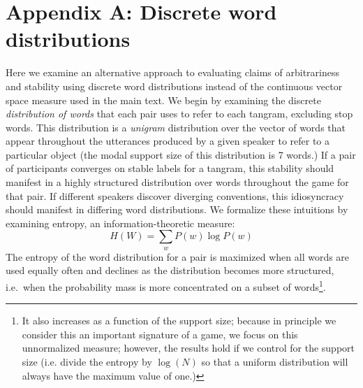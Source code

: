 \documentclass[alpha-refs]{wiley-article}
\begin{document}
\printendnotes



\section*{Appendix A: Discrete word distributions}

Here we examine an alternative approach to evaluating claims of arbitrariness 
 and stability using discrete word distributions instead of the continuous vector space measure used in the main text.
We begin by examining the discrete \emph{distribution of words} that each pair uses to refer to each tangram, excluding stop words.
This distribution is a \emph{unigram} distribution over the vector of words that appear throughout the utterances produced by a given speaker to refer to a particular object (the modal support size of this distribution is 7 words.)
If a pair of participants converges on stable labels for a tangram, this stability should manifest in a highly structured distribution over words throughout the game for that pair.
If different speakers discover diverging conventions, this idiosyncracy should manifest in differing word distributions.
We formalize these intuitions by examining entropy, an information-theoretic measure: $$H(W) = \sum_w P(w) \log P(w)$$
The entropy of the word distribution for a pair is maximized when all words are used equally often and declines as the distribution becomes more structured, i.e.~when the probability mass is more concentrated on a subset of words\footnote{It also increases as a function of the support size; because in principle we consider this an important signature of a game, we focus on this unnormalized measure; however, the results hold if we control for the support size (i.e. divide the entropy by $\log(N)$ so that a uniform distribution will always have the maximum value of one.)}.
\end{document}
